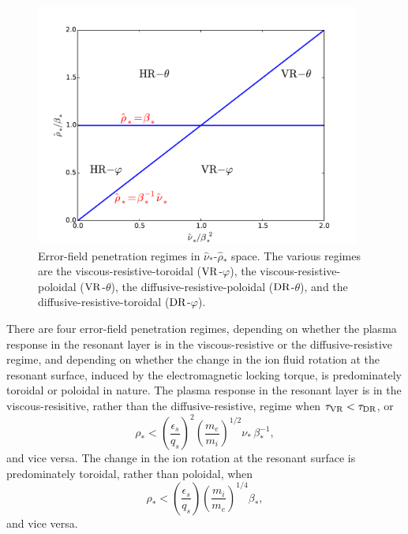 \documentclass[notitlepage,12pt]{article}
\begin{document}
\begin{figure}[t]
\centerline{\includegraphics[width=0.95\textwidth]{Scaling.pdf}}
\caption{Error-field penetration regimes in $\hat{\nu}_\ast$-$\hat{\rho}_\ast$ space. The various regimes are the
viscous-resistive-toroidal (${\rm VR}$-$\varphi$), the viscous-resistive-poloidal (${\rm VR}$-$\theta$), the diffusive-resistive-poloidal (${\rm DR}$-$\theta$), and the  diffusive-resistive-toroidal (${\rm DR}$-$\varphi$). }\label{f6}
\end{figure}

There are four error-field penetration regimes, depending on whether the plasma response in the resonant layer is
in the viscous-resistive or the diffusive-resistive regime, and depending on whether the change in the ion fluid rotation at the resonant surface, induced by the electromagnetic locking torque,  is
predominately toroidal or poloidal in nature. The plasma response in the resonant layer is in the
viscous-resisitive, rather than the diffusive-resistive, regime when $\tau_{\rm VR}<\tau_{\rm DR}$, or
\begin{equation}
\rho_\ast < \left(\frac{\epsilon_s}{q_s}\right)^2\left(\frac{m_e}{m_i}\right)^{1/2}\nu_\ast\,\beta_\ast^{-1},
\end{equation}
and vice versa. The change in the ion rotation at the resonant surface is predominately toroidal, rather than poloidal, when
\begin{equation}
\rho_\ast < \left(\frac{\epsilon_s}{q_s}\right)\left(\frac{m_i}{m_e}\right)^{1/4}\beta_\ast,
\end{equation}
and vice versa. 
\end{document}
